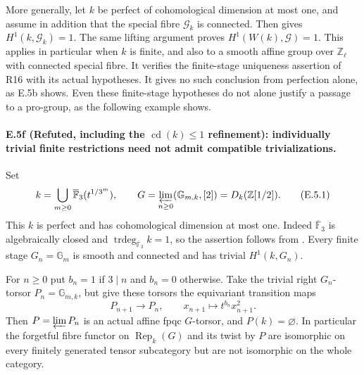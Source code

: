 More generally, let $k$ be perfect of cohomological dimension at most
one, and assume in addition that the special fibre $\mathcal G_k$ is
connected. Then \citet[Theorem 1.9, p.~51]{D_Steinberg1965} gives
$H^1(k,\mathcal G_k)=1$. The same lifting argument proves
$H^1(W(k),\mathcal G)=1$. This applies in particular when $k$ is finite,
and also to a smooth affine group over $\mathbb Z_\ell$ with connected
special fibre. It verifies the finite-stage uniqueness assertion of
R16 with its actual hypotheses. It gives no such conclusion from
perfection alone, as E.5b shows. Even these finite-stage hypotheses do
not alone justify a passage to a pro-group, as the following example
shows.

\paragraph{E.5f (Refuted, including the $\operatorname{cd}(k)\leq1$ refinement): individually trivial finite restrictions need not admit compatible trivializations.}
Set
\[
 k=\bigcup_{m\geq0}\overline{\mathbb F}_3(t^{1/3^m}),\qquad
 G=\varprojlim_{n\geq0}(\mathbb G_{m,k},[2])
   =D_k(\mathbb Z[1/2]).
 \tag{E.5.1}
\]
This $k$ is perfect and has cohomological dimension at most one.
Indeed $\overline{\mathbb F}_3$ is algebraically closed and
$\operatorname{trdeg}_{\overline{\mathbb F}_3}k=1$, so the assertion
follows from \citet[Lemma 59.95.4, Tag 0F0T]{D_Stacks0F0T}.
Every finite stage $G_n=\mathbb G_m$ is smooth and connected and has
trivial $H^1(k,G_n)$.

For $n\geq0$ put $b_n=1$ if $3\mid n$ and $b_n=0$ otherwise. Take the
trivial right $G_n$-torsor $P_n=\mathbb G_{m,k}$, but give these torsors
the equivariant transition maps
\[
 P_{n+1}\longrightarrow P_n,\qquad
 x_{n+1}\longmapsto t^{b_n}x_{n+1}^2.
 \tag{E.5.2}
\]
Then $P=\varprojlim P_n$ is an actual affine fpqc $G$-torsor, and
$P(k)=\varnothing$. In particular the forgetful fibre functor on
$\operatorname{Rep}_k(G)$ and its twist by $P$ are isomorphic on every
finitely generated tensor subcategory but are not isomorphic on the
whole category.

